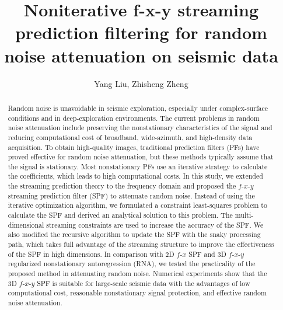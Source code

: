 
\title{Noniterative f-x-y streaming prediction filtering for random noise attenuation on seismic data}

\renewcommand{\thefootnote}{\fnsymbol{footnote}}


\address{
    \footnotemark[1] College of Geo-exploration Science and Technology,\\
    Jilin University, Changchun, China}

\author{Yang Liu\footnotemark[1], Zhisheng Zheng\footnotemark[1]}


\maketitle

\begin{abstract}
  Random noise is unavoidable in seismic exploration, especially under
  complex-surface conditions and in deep-exploration environments. The
  current problems in random noise attenuation include preserving the
  nonstationary characteristics of the signal and reducing
  computational cost of broadband, wide-azimuth, and high-density data
  acquisition. To obtain high-quality images, traditional prediction
  filters (PFs) have proved effective for random noise attenuation,
  but these methods typically assume that the signal is
  stationary. Most nonstationary PFs use an iterative strategy to
  calculate the coefficients, which leads to high computational
  costs. In this study, we extended the streaming prediction theory to
  the frequency domain and proposed the $f$-$x$-$y$ streaming
  prediction filter (SPF) to attenuate random noise.  Instead of using
  the iterative optimization algorithm, we formulated a constraint
  least-squares problem to calculate the SPF and derived an analytical
  solution to this problem.  The multi-dimensional streaming
  constraints are used to increase the accuracy of the SPF. We also
  modified the recursive algorithm to update the SPF with the snaky
  processing path, which takes full advantage of the streaming
  structure to improve the effectiveness of the SPF in high
  dimensions. In comparison with 2D $f$-$x$ SPF and 3D $f$-$x$-$y$
  regularized nonstationary autoregression (RNA), we tested the
  practicality of the proposed method in attenuating random
  noise. Numerical experiments show that the 3D $f$-$x$-$y$ SPF is
  suitable for large-scale seismic data with the advantages of low
  computational cost, reasonable nonstationary signal protection, and
  effective random noise attenuation.

\end{abstract}

